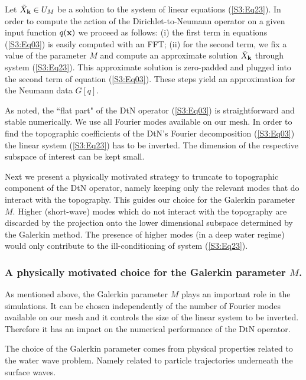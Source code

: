 Let $\tilde{X}_{\bold{k}}\in U_M$ be a solution to the system of linear equations (\ref{S3:Eq23}). 
In order to compute the action of the Dirichlet-to-Neumann operator on a given input function $q(\bold{x})$ we proceed as follows:
(i) the first term in equations (\ref{S3:Eq03}) is easily computed with an FFT; 
(ii) for the second term, we fix a value of the parameter $M$ and compute an approximate solution $\tilde{X}_{\bold{k}}$ 
through system (\ref{S3:Eq23}). This approximate solution is zero-padded and  plugged into the second term of equation (\ref{S3:Eq03}). These steps yield an approximation for the Neumann data $G[q]$. 

As noted, the ``flat part" of the DtN operator (\ref{S3:Eq03}) is straightforward and stable numerically. We use all Fourier modes available on our  mesh. In order to find the topographic coefficients
of the DtN's  Fourier decomposition  (\ref{S3:Eq03}) the linear system (\ref{S3:Eq23})
has to be inverted. 
The dimension of the respective subspace of interest can be kept small. 

Next we present 
a physically motivated  strategy to truncate to topographic component of the DtN operator, namely keeping only the relevant modes
that do interact with the topography. This guides our choice for the Galerkin parameter $M$. 
Higher (short-wave) modes which do not interact with the topography are discarded by the projection onto the lower
dimensional subspace determined by the Galerkin method. The presence of higher modes (in a deep water
regime) would only contribute to the ill-conditioning of system  (\ref{S3:Eq23}).

\subsubsection{A physically motivated choice for the  Galerkin parameter $M$.}

As mentioned above, the Galerkin parameter $M$ plays an important role in the simulations.  
It can be chosen independently of the number of Fourier modes available on our mesh and it controls 
the size of the linear system to be inverted.  Therefore it has an impact on the numerical performance of the DtN operator.

The choice of the Galerkin parameter comes from  physical properties related to the water wave problem. 
Namely related to  particle trajectories underneath the surface waves. 

